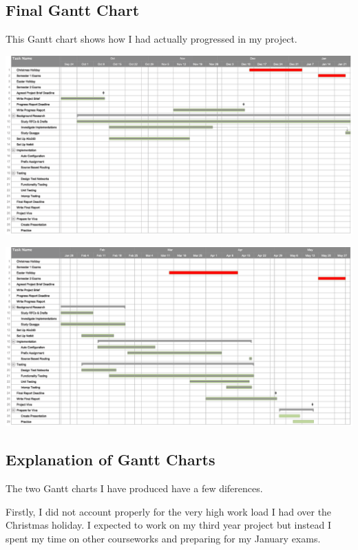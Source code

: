 \documentclass[12pt]{report}
\begin{document}
\begin{landscape}
\pagebreak

\subsection{Final Gantt Chart}
This Gantt chart shows how I had actually progressed in my project.

\begin{center}
  \includegraphics[width=\linewidth]{../Gantt/FinalGanttPt1.png}
\end{center}

\begin{center}
  \includegraphics[width=\linewidth]{../Gantt/FinalGanttPt2.png}
\end{center}

\end{landscape}

\pagebreak

\subsection{Explanation of Gantt Charts}
The two Gantt charts I have produced have a few diferences.

Firstly, I did not account properly for the very high work load I had over the
Christmas holiday. I expected to work on my third year project but
instead I spent my time on other courseworks and preparing for my
January exams. 
\end{document}

